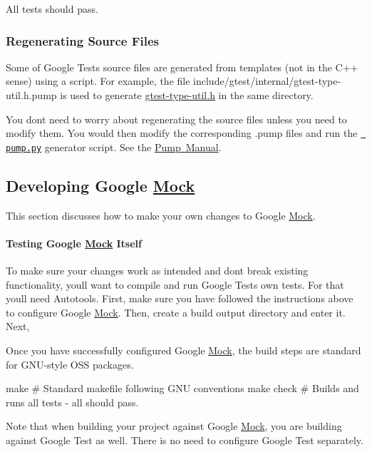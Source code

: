 All tests should pass.

\subsubsection*{Regenerating Source Files}

Some of Google Test\textquotesingle{}s source files are generated from templates (not in the C++ sense) using a script. For example, the file include/gtest/internal/gtest-\/type-\/util.\+h.\+pump is used to generate \mbox{\hyperlink{gtest-type-util_8h}{gtest-\/type-\/util.\+h}} in the same directory.

You don\textquotesingle{}t need to worry about regenerating the source files unless you need to modify them. You would then modify the corresponding {\ttfamily .pump} files and run the \textquotesingle{}\href{googletest/scripts/pump.py}{\texttt{ pump.\+py}}\textquotesingle{} generator script. See the \mbox{\hyperlink{PumpManual_8md}{Pump Manual}}.

\subsection*{Developing Google \mbox{\hyperlink{classMock}{Mock}}}

This section discusses how to make your own changes to Google \mbox{\hyperlink{classMock}{Mock}}.

\paragraph*{Testing Google \mbox{\hyperlink{classMock}{Mock}} Itself}

To make sure your changes work as intended and don\textquotesingle{}t break existing functionality, you\textquotesingle{}ll want to compile and run Google Test\textquotesingle{}s own tests. For that you\textquotesingle{}ll need Autotools. First, make sure you have followed the instructions above to configure Google \mbox{\hyperlink{classMock}{Mock}}. Then, create a build output directory and enter it. Next, 


Once you have successfully configured Google \mbox{\hyperlink{classMock}{Mock}}, the build steps are standard for G\+N\+U-\/style O\+SS packages. \begin{DoxyVerb}make        # Standard makefile following GNU conventions
make check  # Builds and runs all tests - all should pass.
\end{DoxyVerb}


Note that when building your project against Google \mbox{\hyperlink{classMock}{Mock}}, you are building against Google Test as well. There is no need to configure Google Test separately. 